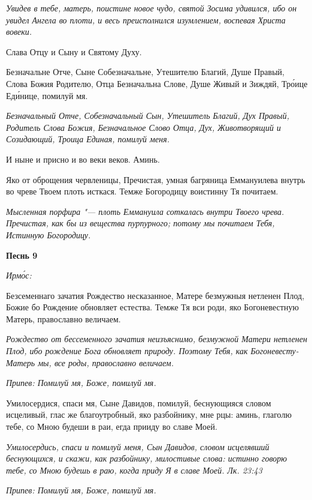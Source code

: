 \itshape Увидев в тебе, матерь, поистине новое чудо, святой Зосима удивился, ибо он увидел Ангела во плоти, и весь преисполнился изумлением, воспевая Христа вовеки.\normalfont{}


Слава Отцу и Сыну и Святому Духу.


Безначальне Отче, Сыне Собезначальне, Утешителю Благий, Душе Правый, Слова Божия Родителю, Отца Безначальна Слове, Душе Живый и Зиждяй, Тро́ице Еди́нице, помилуй мя.


\itshape Безначальный Отче, Собезначальный Сын, Утешитель Благий, Дух Правый, Родитель Слова Божия, Безначальное Слово Отца, Дух, Животворящий и Созидающий, Троица Единая, помилуй меня.\normalfont{}


И ныне и присно и во веки веков. Аминь.


Яко от оброщения червленицы, Пречистая, умная багряница Еммануилева внутрь во чреве Твоем плоть исткася. Темже Богородицу воистинну Тя почитаем.


\itshape Мысленная порфира "--- плоть Еммануила соткалась внутри Твоего чрева. Пречистая, как бы из вещества пурпурного; потому мы почитаем Тебя, Истинную Богородицу.\normalfont{}





\bfseries Песнь 9\normalfont{}


\itshape Ирмо́с:\normalfont{}


Безсеменнаго зачатия Рождество несказанное, Матере безмужныя нетленен Плод, Божие бо Рождение обновляет естества. Темже Тя вси роди, яко Богоневестную Матерь, православно величаем.


\itshape Рождество от бессеменного зачатия неизъяснимо, безмужной Матери нетленен Плод, ибо рождение Бога обновляет природу. Поэтому Тебя, как Богоневесту-Матерь мы, все роды, православно величаем.\normalfont{}


\itshape Припев:\normalfont{} Помилуй мя, Боже, помилуй мя.


Умилосердися, спаси мя, Сыне Давидов, помилуй, беснующияся словом исцеливый, глас же благоутробный, яко разбойнику, мне рцы: аминь, глаголю тебе, со Мною будеши в раи, егда прииду во славе Моей.


\itshape Умилосердись, спаси и помилуй меня, Сын Давидов, словом исцелявший беснующихся, и скажи, как разбойнику, милостивые слова: истинно говорю тебе, со Мною будешь в раю, когда приду Я в славе Моей. Лк. 23:43\normalfont{}


\itshape Припев:\normalfont{} Помилуй мя, Боже, помилуй мя.



